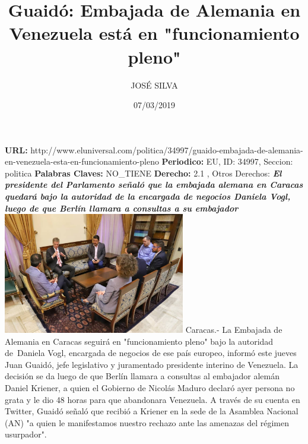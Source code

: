 \documentclass{article}%
\title{\textbf{Guaidó: Embajada de Alemania en Venezuela está en "funcionamiento pleno"}}%
\author{JOSÉ SILVA}%
\date{07/03/2019}%
\begin{document}
%
\normalsize%
\maketitle%
\textbf{URL: }%
http://www.eluniversal.com/politica/34997/guaido{-}embajada{-}de{-}alemania{-}en{-}venezuela{-}esta{-}en{-}funcionamiento{-}pleno\newline%
%
\textbf{Periodico: }%
EU, %
ID: %
34997, %
Seccion: %
politica\newline%
%
\textbf{Palabras Claves: }%
NO\_TIENE\newline%
%
\textbf{Derecho: }%
2.1%
, Otros Derechos: %
\newline%
%
\textbf{\textit{El presidente del Parlamento señaló que la embajada alemana en Caracas quedará bajo la autoridad de la encargada de negocios Daniela Vogl, luego de que Berlín llamara a consultas a su embajador}}%
\newline%
\newline%
%
\includegraphics[width=300px]{EU_34997.jpg}%
\newline%
%
Caracas.{-} La Embajada de Alemania en Caracas seguirá en "funcionamiento pleno" bajo la autoridad de~Daniela Vogl, encargada de negocios de ese país europeo, informó este jueves Juan Guaidó, jefe legislativo y juramentado presidente interino de Venezuela.%
\newline%
%
La decisión se da luego de que Berlín llamara a consultas al embajador alemán Daniel Kriener, a quien el Gobierno de Nicolás Maduro declaró ayer persona no grata y le dio 48 horas para que abandonara Venezuela.%
\newline%
%
A través de su cuenta en Twitter, Guaidó señaló que recibió a Kriener en la sede de la Asamblea Nacional (AN) "a quien le manifestamos nuestro rechazo ante las amenazas del régimen usurpador".%
\newline%
%
\end{document}
